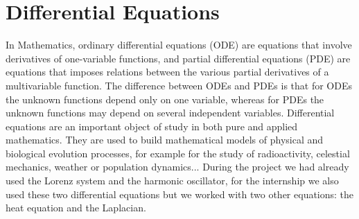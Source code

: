 \documentclass[12pt]{article}
\begin{document}
	\section{Differential Equations}
	\noindent In Mathematics, ordinary differential equations (ODE) are equations that involve derivatives of one-variable functions, and partial differential equations (PDE) are equations that imposes relations between the various partial derivatives of a multivariable function.
	The difference between ODEs and PDEs is that for ODEs the unknown functions depend only on one variable, whereas for PDEs the unknown functions may depend on several independent variables.
	\noindent Differential equations are an important object of study in both pure and applied mathematics. They are used to build mathematical models of physical and biological evolution processes, for example for the study of radioactivity, celestial mechanics, weather or population dynamics... 
	\noindent During the project we had already used the Lorenz system and the harmonic oscillator, for the internship we also used these two differential equations but we worked with two other equations: the heat equation and the Laplacian.
	
\end{document}
